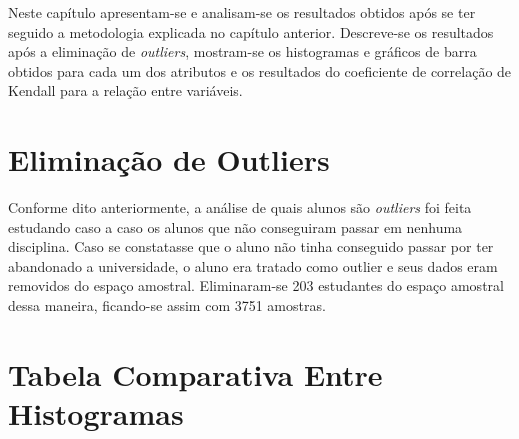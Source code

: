 

Neste capítulo apresentam-se e analisam-se os resultados obtidos após se ter seguido a
metodologia explicada no capítulo anterior. Descreve-se os resultados após a
eliminação de \textit{outliers}, mostram-se os histogramas e gráficos de barra obtidos para
cada um dos atributos e os resultados do coeficiente de correlação de Kendall para a
relação entre variáveis. 

\section{Eliminação de Outliers}
Conforme dito anteriormente, a análise de quais alunos são \textit{outliers} foi feita
estudando caso a caso os alunos que não conseguiram passar em nenhuma disciplina.
Caso se constatasse que o aluno não tinha conseguido passar por ter abandonado a
universidade, o aluno era tratado como outlier e seus dados eram removidos do espaço
amostral. Eliminaram-se 203 estudantes do espaço amostral dessa maneira, ficando-se
assim com 3751 amostras. 


\section{Tabela Comparativa Entre Histogramas}




